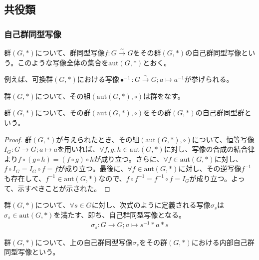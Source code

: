 \documentclass[dvipdfmx]{jsarticle}
\begin{document}
\subsection{共役類}%
\subsubsection{自己群同型写像}%
\begin{dfn}
群$(G,*)$について、群同型写像$f:G\overset{\sim}{\rightarrow}G$をその群$(G,*)$の自己群同型写像という。このような写像全体の集合を$\mathrm{aut}(G,*)$とおく。
\end{dfn}\par
例えば、可換群$(G,*)$における写像$\bullet^{- 1}:G\overset{\sim}{\rightarrow}G;a \mapsto a^{- 1}$が挙げられる。
\begin{thm}\label{3.1.3.1}
群$(G,*)$について、その組$\left( \mathrm{aut}(G,*), \circ \right)$は群をなす。
\end{thm}
\begin{dfn}
群$(G,*)$について、その群$\left( \mathrm{aut}(G,*), \circ \right)$をその群$(G,*)$の自己群同型群という。
\end{dfn}
\begin{proof}
  群$(G,*)$が与えられたとき、その組$\left( \mathrm{aut}(G,*), \circ \right)$について、恒等写像$I_G :G\rightarrow G; a\mapsto a$を用いれば、$\forall f,g,h\in \mathrm{aut}(G,*)$に対し、写像の合成の結合律より$f\circ \left(g \circ h\right) =\left(f \circ g\right) \circ h$が成り立つ。さらに、$\forall f\in \mathrm{aut}(G,*)$に対し、$f\circ I_G =I_G \circ f =f$が成り立つ。最後に、$\forall f\in \mathrm{aut}(G,*)$に対し、その逆写像$f^{-1}$も存在して、$f^{-1}\in \mathrm{aut}(G,*)$なので、$f\circ f^{-1} =f^{-1} \circ f=I_G $が成り立つ。よって、示すべきことが示された。
\end{proof}
\begin{thm}\label{3.1.3.2}
群$(G,*)$について、$\forall s \in G$に対し、次式のように定義される写像$\sigma_{s}$は$\sigma_{s} \in \mathrm{aut}(G,*)$を満たす、即ち、自己群同型写像となる。
\begin{align*}
\sigma_{s}:G \rightarrow G;a \mapsto s^{- 1}*a*s
\end{align*}
\end{thm}
\begin{dfn}
群$(G,*)$について、上の自己群同型写像$\sigma_{s}$をその群$(G,*)$における内部自己群同型写像という。
\end{dfn}
\end{document}
